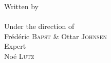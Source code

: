 {\begin{titlepage}
\begin{center}
{\large Written by}\\[2mm]
{\LARGE \authorname } \\[1.0cm]

{Under the direction of} \\[2mm]
{\large Frédéric \textsc{Bapst} \& Ottar \textsc{Johnsen} } \\[5mm]

{Expert} \\[2mm]
{\large Noé \textsc{Lutz} }

\vfill




\end{center}
\end{titlepage}}
